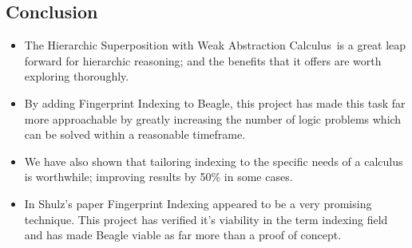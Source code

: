 \documentclass[10pt,xcolor={dvipsnames}]{beamer}
\newcommand{\HSWAC}{Hierarchic Superposition with Weak Abstraction Calculus}
\begin{document}
\begin{NoHyper}
\section{Conclusion}

\begin{frame}
  \begin{itemize}
  \frametitle{The Benefits of Indexing Beagle}
  \item<1-> The \HSWAC\ is a great leap forward for hierarchic reasoning; and the benefits
  that it offers are worth exploring thoroughly.
  \item<2-> By adding Fingerprint Indexing to Beagle, this project
  has made this task far more approachable by greatly increasing the number of
  logic problems which can be solved within a reasonable timeframe.
  \item<3-> We have also shown that tailoring indexing to the specific needs of
  a calculus is worthwhile; improving results by 50\% in some cases.
  \item<4-> In Shulz's paper Fingerprint Indexing appeared to be a very promising technique.
  This project has verified it's viability in the term indexing field and has made
  Beagle viable as far more than a proof of concept.
  \end{itemize}
\end{frame}


\end{NoHyper}
\end{document}
